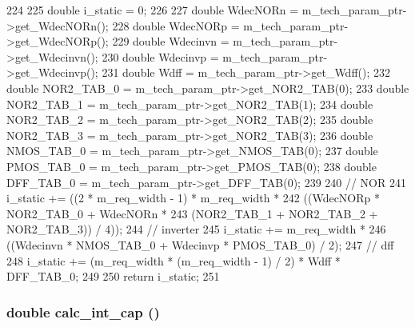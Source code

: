 \begin{DoxyCode}
224 {
225     double i_static = 0;
226 
227     double WdecNORn = m_tech_param_ptr->get_WdecNORn();
228     double WdecNORp = m_tech_param_ptr->get_WdecNORp();
229     double Wdecinvn = m_tech_param_ptr->get_Wdecinvn();
230     double Wdecinvp = m_tech_param_ptr->get_Wdecinvp();
231     double Wdff = m_tech_param_ptr->get_Wdff();
232     double NOR2_TAB_0 = m_tech_param_ptr->get_NOR2_TAB(0);
233     double NOR2_TAB_1 = m_tech_param_ptr->get_NOR2_TAB(1);
234     double NOR2_TAB_2 = m_tech_param_ptr->get_NOR2_TAB(2);
235     double NOR2_TAB_3 = m_tech_param_ptr->get_NOR2_TAB(3);
236     double NMOS_TAB_0 = m_tech_param_ptr->get_NMOS_TAB(0);
237     double PMOS_TAB_0 = m_tech_param_ptr->get_PMOS_TAB(0);
238     double DFF_TAB_0 = m_tech_param_ptr->get_DFF_TAB(0);
239 
240     // NOR
241     i_static += ((2 * m_req_width - 1) * m_req_width * 
242                  ((WdecNORp * NOR2_TAB_0 + WdecNORn * 
243                    (NOR2_TAB_1 + NOR2_TAB_2 + NOR2_TAB_3)) / 4));
244     // inverter
245     i_static += m_req_width * 
246         ((Wdecinvn * NMOS_TAB_0 + Wdecinvp * PMOS_TAB_0) / 2);
247     // dff
248     i_static += (m_req_width * (m_req_width - 1) / 2) * Wdff * DFF_TAB_0;
249 
250     return i_static;
251 }
\end{DoxyCode}
\hypertarget{classMatrixArbiter_a16e2ab6e99c8b2e72fb306b6d6094699}{
\subsubsection[{calc\_\-int\_\-cap}]{\setlength{\rightskip}{0pt plus 5cm}double calc\_\-int\_\-cap ()}}
\label{classMatrixArbiter_a16e2ab6e99c8b2e72fb306b6d6094699}



